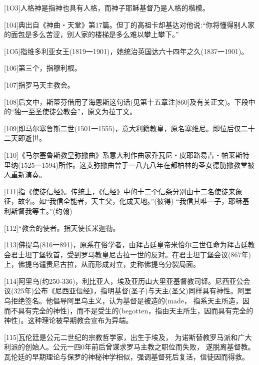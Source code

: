 \documentclass{article}
\begin{document}
[1O3]人格神是指神也具有人格，而神子耶稣基督乃是人格的楷模。



[104]典出自《神曲・天堂》第17篇。但丁的高祖卡却基达对他说:“你将懂得别人家的面包是多么苦涩，别人家的楼梯是多么难以攀上攀下。”



[1O5]指维多利亚女王(1819一1901)，她统治英国达六十四年之久(1837一1901)。



[106]第三个，指穆利根。



[107]指罗马天主教会。



[108]后文中，斯蒂芬借用了海恩斯这句话(见第十五章注[860]及有关正文)。下段中的“独一至圣使徒公教会”，原文为拉丁文。



[109]即马尔塞鲁斯二世(1501一1555)，意大利籍教皇，原名塞维尼。即位后仅二十二天即逝世。



[110]《马尔塞鲁斯教皇弥撒曲》系意大利作曲家乔瓦尼・皮耶路易吉・帕莱斯特里纳(1525一1594)所作。这支弥撒曲曾于一八九八年在都柏林的圣女德肋撒教堂被人重新演奏。



[111]指《使徒信经》。传统上，《信经》中的十二个信条分别由十二名使徒来象征，故名。如“我信全能者，天主父，化成天地。”(彼得) “我信其唯一子，耶稣基利斯督我等主。”(约翰)



[112]“教会的使者。指天使长米迦勒。



[113]佛提乌(816一891)，原系在俗学者，由拜占廷皇帝米恰尔三世任命为拜占廷教会君士坦丁堡牧首，受到罗马教皇尼古拉一世的反对。在君士坦丁堡会议(867年)上，佛提乌谴责尼古拉，从而形成对立，史称佛提乌分裂局面。



[114]阿里乌(约250-336)，利比亚人，埃及亚历山大里亚基督教司铎。尼西亚公会议(325年)公布《尼西亚信经》，指明基督(圣子)与天主(圣父)同样具有神性。阿里乌拒绝签名。他倡导阿里乌主义，认为基督是被造的(made， 指系天主所造，因而不具有完全的神性)，而不是受生的(begotten，指由天主所生，因而具有完全的神性)。这种理论被早期教会宣布为异端。



[115]瓦伦廷是公元二世纪的宗教哲学家，出生于埃及， 为诺斯替教罗马派和广大利派的创始人。公元一四0年前后曾谋求罗马主教之职位而失败， 遂脱离基督教。瓦伦廷的早期理论与保罗的神秘神学相似，强调基督死后复活，信徒因而得救。
\end{document}
